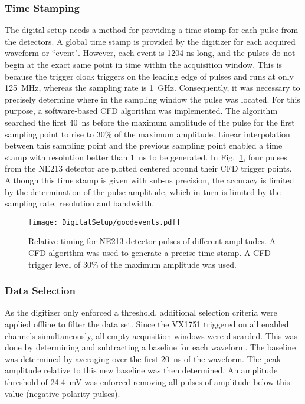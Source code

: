 \documentclass[main.tex]{subfiles}
\begin{document}
\subsubsection{Time Stamping}
The digital setup needs a method for providing a time stamp for each pulse from the detectors. A global time stamp is provided by the digitizer for each acquired waveform or ``event". However, each event is 1204 ns long, and the pulses do not begin at the exact same point in time within the acquisition window. This is because the trigger clock triggers on the leading edge of pulses and runs at only \SI{125}{MHz}, whereas the sampling rate is \SI{1}{GHz}. Consequently, it was necessary to precisely determine where in the sampling window the pulse was located. For this purpose, a software-based CFD algorithm was implemented. The algorithm searched the first \SI{40}{ns} before the maximum amplitude of the pulse for the first sampling point to rise to 30\% of the maximum amplitude. Linear interpolation between this sampling point and the previous sampling point enabled a time stamp with resolution better than \SI{1}{ns} to be generated. In Fig.~\ref{fig:cfd_trig}, four pulses from the NE213 detector are plotted centered around their CFD trigger points. Although this time stamp is given with sub-ns precision, the accuracy is limited by the determination of the pulse amplitude, which in turn is limited by the sampling rate, resolution and bandwidth. 

\begin{figure}[hb!]
    \centering
        \texttt{[image: DigitalSetup/goodevents.pdf]}
        \caption[Relative timing for NE213 detector pulses of different amplitudes.]{Relative timing for NE213 detector pulses of different amplitudes. A CFD algorithm was used to generate a precise time stamp. A CFD trigger level of 30\% of the maximum amplitude was used.}
    \label{fig:cfd_trig} 
\end{figure}

\subsubsection{Data Selection}
As the digitizer only enforced a threshold, additional selection criteria were applied offline to filter the data set. Since the VX1751 triggered on all enabled channels simultaneously, all empty acquisition windows were discarded. This was done by determining and subtracting a baseline for each waveform. The baseline was determined by averaging over the first \SI{20}{ns} of the waveform. The peak amplitude relative to this new baseline was then determined. An amplitude threshold of \SI{24.4}{mV} was enforced removing all pulses of amplitude below this value (negative polarity pulses).
\end{document}
